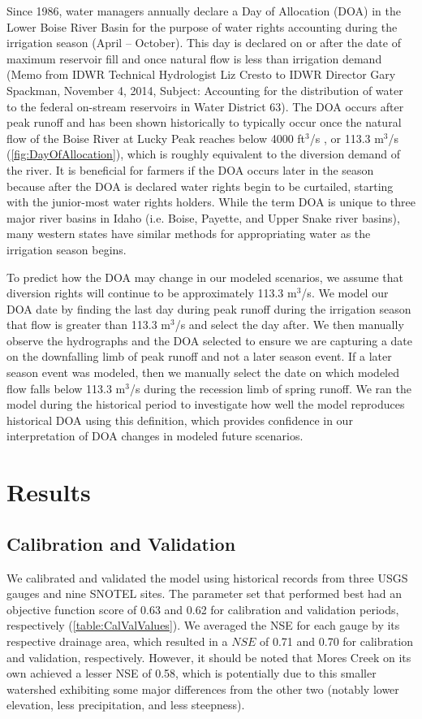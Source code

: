 \documentclass[water,article,submit,moreauthors,pdftex,10pt,a4paper]{mdpi}
\theoremstyle{mdpi}
\newcounter{ex}
\newcounter{re}
\theoremstyle{mdpidefinition}
\begin{document}
Since 1986, water managers annually declare a Day of Allocation (DOA) in the Lower Boise River Basin for the purpose of water rights accounting during the irrigation season (April – October). This day is declared on or after the date of maximum reservoir fill and once natural flow is less than irrigation demand (Memo from IDWR Technical Hydrologist Liz Cresto to IDWR Director Gary Spackman, November 4, 2014, Subject: Accounting for the distribution of water to the federal on-stream reservoirs in Water District 63). The DOA occurs after peak runoff and has been shown historically to typically occur once the natural flow of the Boise River at Lucky Peak reaches below 4000 ft${}^3$/s \citep{Garst:2017bg}, or 113.3 m${}^3$/s (\cref{fig:DayOfAllocation}), which is roughly equivalent to the diversion demand of the river. It is beneficial for farmers if the DOA occurs later in the season because after the DOA is declared water rights begin to be curtailed, starting with the junior-most water rights holders. While the term DOA is unique to three major river basins in Idaho (i.e. Boise, Payette, and Upper Snake river basins), many western states have similar methods for appropriating water as the irrigation season begins.

To predict how the DOA may change in our modeled scenarios, we assume that diversion rights will continue to be approximately 113.3 m${}^3$/s. We model our DOA date by finding the last day during peak runoff during the irrigation season that flow is greater than 113.3 m${}^3$/s and select the day after. We then manually observe the hydrographs and the DOA selected to ensure we are capturing a date on the downfalling limb of peak runoff and not a later season event. If a later season event was modeled, then we manually select the date on which modeled flow falls below 113.3 m${}^3$/s during the recession limb of spring runoff. We ran the model during the historical period to investigate how well the model reproduces historical DOA using this definition, which provides confidence in our interpretation of DOA changes in modeled future scenarios.

\section{Results}

\subsection{Calibration and Validation}
We calibrated and validated the model using historical records from three USGS gauges and nine SNOTEL sites. The parameter set that performed best had an objective function score of 0.63 and 0.62 for calibration and validation periods, respectively (\cref{table:CalValValues}). We averaged the NSE for each gauge by its respective drainage area, which resulted in a $NSE$ of 0.71 and 0.70 for calibration and validation, respectively. However, it should be noted that Mores Creek on its own achieved a lesser NSE of 0.58, which is potentially due to this smaller watershed exhibiting some major differences from the other two (notably lower elevation, less precipitation, and less steepness).
\end{document}
